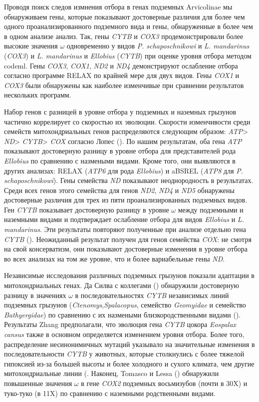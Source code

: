 Проводя поиск следов измнения отбора в генах подземных Arvicolinae мы обнаруживаем гены, которые показывают достоверные различия для более чем одного проанализированного подземного вида и гены, обнаруженные в более чем в одном анализе анализ. Так, гены \textit{CYTB} и \textit{COX3} продемонстрировали более высокие значения $\omega$ одновременно у видов \textit{P. schaposchnikowi} и \textit{L. mandarinus} (\textit{COX3}) и \textit{L. mandarinus} и \textit{Ellobius} (\textit{CYTB}) при оценке уровня отбора методом codeml. Гены \textit{COX3}, \textit{COX1}, \textit{ND2} и \textit{ND4} демонстрируют ослабление отбора согласно программе RELAX по крайней мере для двух видов. Гены \textit{COX1} и \textit{COX3} были обнаружены как наиболее изменчивые при сравнении результатов нескольких программ. 


Набор генов с разницей в уровне отбора у подземных и наземных грызунов частично коррелирует со скоростью их эволюции. Скорости изменчивости среди семейств митохондриальных генов распределяются следующим образом: \textit{ATP}> \textit{ND}> \textit{CYTB}> \textit{COX} согласно Лопес (\cite{Lopez1997}). По нашим результатам, оба гена \textit{ATP} показывают достоверную разницу в уровне отбора для представителей рода \textit{Ellobius} по сравнению с назмеными видами. Кроме того, они выявляются в других анализах: RELAX (\textit{ATP6} для рода \textit{Ellobius}) и aBSREL (\textit{ATP8} для \textit{P. schaposchnikowi}). Гены семейства \textit{ND} показывают неоднородность в результатах. Среди всех генов этого семейства для генов \textit{ND2}, \textit{ND4} и \textit{ND5} обнаружены достоверные различия для трех из пяти проанализированных подземных видов. Ген \textit{CYTB} показывает достоверную разницу в уровне $\omega$ между подземными и наземными видами и подтверждает ослабление отбора для видов \textit{Ellobius} и \textit{L. mandarinus}. Эти результаты повторяют полученные при анализе отдельно гена \textit{CYTB} (\cite{Bondareva2021}). Неожиданный результат получен для генов семейства \textit{COX}: не смотря на свой консерватизм, они показывают достоверные изменения в уровне отбора во всех анализах на том же уровне, что и более вариабельные гены \textit{ND}.


Независимые исследования различных подземных грызунов показали адаптации в митохондриальных генах. Да Силва с коллегами (\cite{DaSilva2009}) обнаружили достоверную разницу в значениях $\omega$ в последовательностях \textit{CYTB} независимых линий подземных грызунов (\textit{Ctenomys},\textit{Spalacopus}, семейство \textit{Geomyidae} и семейство \textit{Bathyergidae}) по сравнению с их назмеными близкородственными видами (\cite{Tomasco2014}). Результаты Zhang предполагали, что эволюция гена \textit{CYTB} цокора \textit{Eospalax cansus} также в основном определяется изменением уровня отбора. Более того, распределение несинонимичных мутаций указывало на значительные изменения в последовательности \textit{CYTB} у животных, которые столкнулись с более тяжелой гипоксией из-за большей высоты и более холодного и сухого климата, чем другие митохондриальные линии (\cite{Zhang2013a}. Наконец, Tomasco и Lessa (\cite{Tomasco2011}) обнаружили повышенные значения $\omega$ в гене \textit{COX2} подземных восьмизубов (почти в 30X) и туко-туко (в 11X) по сравнению с наземными родственными видами. 


